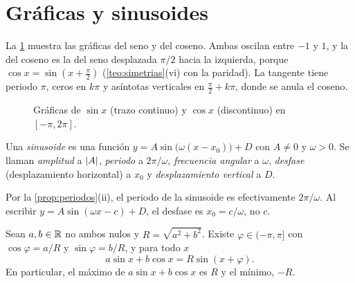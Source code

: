 \section{Gráficas y sinusoides}

La \cref{fig:graficas} muestra las gráficas del seno y del coseno. Ambas oscilan entre $-1$ y $1$, y la del coseno es la del seno desplazada $\pi/2$ hacia la izquierda, porque $\cos x=\sin(x+\frac{\pi}{2})$ (\cref{teo:simetrias}(vi) con la paridad). La tangente tiene periodo $\pi$, ceros en $k\pi$ y asíntotas verticales en $\frac{\pi}{2}+k\pi$, donde se anula el coseno.

\begin{figure}[ht]
\centering
{}
\caption{Gráficas de $\sin x$ (trazo continuo) y $\cos x$ (discontinuo) en $[-\pi,2\pi]$.}
\label{fig:graficas}
\end{figure}

\begin{definicion}[Sinusoide]
Una \emph{sinusoide} es una función $y=A\sin\bigl(\omega(x-x_0)\bigr)+D$ con $A\ne0$ y $\omega>0$. Se llaman \emph{amplitud} a $\lvert A\rvert$, \emph{periodo} a $2\pi/\omega$, \emph{frecuencia angular} a $\omega$, \emph{desfase} (desplazamiento horizontal) a $x_0$ y \emph{desplazamiento vertical} a $D$.
\end{definicion}

Por la \cref{prop:periodos}(ii), el periodo de la sinusoide es efectivamente $2\pi/\omega$. Al escribir $y=A\sin(\omega x-c)+D$, el desfase es $x_0=c/\omega$, no $c$.

\begin{proposicion}\label{prop:armonico}
Sean $a,b\in\mathbb{R}$ no ambos nulos y $R=\sqrt{a^{2}+b^{2}}$. Existe $\varphi\in(-\pi,\pi]$ con $\cos\varphi=a/R$ y $\sin\varphi=b/R$, y para todo $x$
\[
a\sin x+b\cos x=R\sin(x+\varphi).
\]
En particular, el máximo de $a\sin x+b\cos x$ es $R$ y el mínimo, $-R$.
\end{proposicion}

